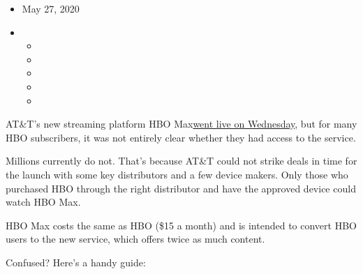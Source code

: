 \begin{itemize}
\item
  May 27, 2020
\item
  \begin{itemize}
  \item
  \item
  \item
  \item
  \item
  \end{itemize}
\end{itemize}

AT\&T's new streaming platform HBO
Max\href{https://www.nytimes3xbfgragh.onion/2020/05/26/business/media/hbo-max-netflix-streaming.html}{went
live on Wednesday}, but for many HBO subscribers, it was not entirely
clear whether they had access to the service.

Millions currently do not. That's because AT\&T could not strike deals
in time for the launch with some key distributors and a few device
makers. Only those who purchased HBO through the right distributor and
have the approved device could watch HBO Max.

HBO Max costs the same as HBO (\$15 a month) and is intended to convert
HBO users to the new service, which offers twice as much content.

Confused? Here's a handy guide:

